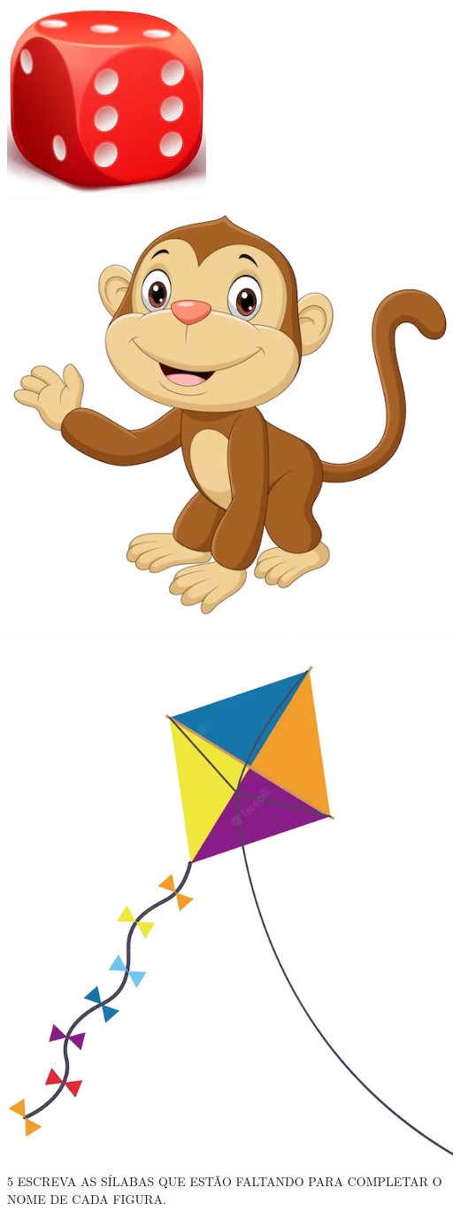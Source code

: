 \begin{escolha}
\item \includegraphics[width=.25\textwidth]{media/image14.png}\\

\item \includegraphics[width=.25\textwidth]{media/image15.png}\\

\item \includegraphics[width=.25\textwidth]{media/image16.png}\\
\end{escolha}


\num{5} ESCREVA AS SÍLABAS QUE ESTÃO FALTANDO PARA COMPLETAR O NOME DE CADA FIGURA.
\bigskip


